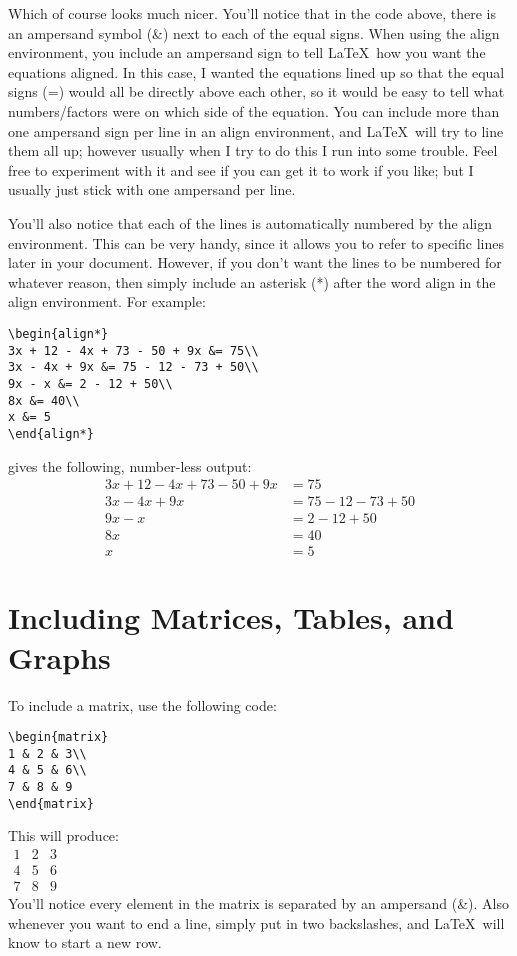 \documentclass{article}
\begin{document}
Which of course looks much nicer. You'll notice that in the code above, there is an ampersand symbol (\&) next to each of the equal signs. When using the align environment, you include an ampersand sign to tell \LaTeX~how you want the equations aligned. In this case, I wanted the equations lined up so that the equal signs (=) would all be directly above each other, so it would be easy to tell what numbers/factors were on which side of the equation. You can include more than one ampersand sign per line in an align environment, and \LaTeX~will try to line them all up; however usually when I try to do this I run into some trouble. Feel free to experiment with it and see if you can get it to work if you like; but I usually just stick with one ampersand per line. 

You'll also notice that each of the lines is automatically numbered by the align environment. This can be very handy, since it allows you to refer to specific lines later in your document. However, if you don't want the lines to be numbered for whatever reason, then simply include an asterisk (*) after the word align in the align environment. For example: \begin{verbatim}
\begin{align*}
3x + 12 - 4x + 73 - 50 + 9x &= 75\\
3x - 4x + 9x &= 75 - 12 - 73 + 50\\
9x - x &= 2 - 12 + 50\\
8x &= 40\\
x &= 5
\end{align*} \end{verbatim}  gives the following, number-less output: 
\begin{align*}
3x + 12 - 4x + 73 - 50 + 9x &= 75\\
3x - 4x + 9x &= 75 - 12 - 73 + 50\\
9x - x &= 2 - 12 + 50\\
8x &= 40\\
x &= 5
\end{align*}

\section{Including Matrices, Tables, and Graphs}
To include a matrix, use the following code:
\begin{verbatim}
\begin{matrix}
1 & 2 & 3\\
4 & 5 & 6\\
7 & 8 & 9
\end{matrix}
\end{verbatim}
This will produce:\\
$\begin{matrix}
1 & 2 & 3\\
4 & 5 & 6\\
7 & 8 & 9
\end{matrix}$\\
You'll notice every element in the matrix is separated by an ampersand (\&). Also whenever you want to end a line, simply put in two backslashes, and \LaTeX~will know to start a new row. 
\end{document}
